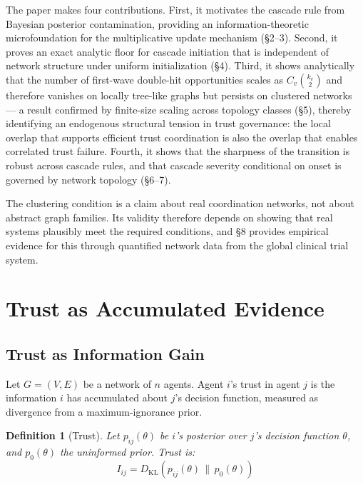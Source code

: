 \documentclass[11pt,a4paper]{article}
\newtheorem{definition}{Definition}
\begin{document}
The paper makes four contributions. First, it motivates the cascade rule from Bayesian posterior contamination, providing an information-theoretic microfoundation for the multiplicative update mechanism (\S2--3). Second, it proves an exact analytic floor for cascade initiation that is independent of network structure under uniform initialization (\S4). Third, it shows analytically that the number of first-wave double-hit opportunities scales as $C_v \binom{k_v}{2}$ and therefore vanishes on locally tree-like graphs but persists on clustered networks --- a result confirmed by finite-size scaling across topology classes (\S5), thereby identifying an endogenous structural tension in trust governance: the local overlap that supports efficient trust coordination is also the overlap that enables correlated trust failure. Fourth, it shows that the sharpness of the transition is robust across cascade rules, and that cascade severity conditional on onset is governed by network topology (\S6--7).

The clustering condition is a claim about real coordination networks, not about abstract graph families. Its validity therefore depends on showing that real systems plausibly meet the required conditions, and \S8 provides empirical evidence for this through quantified network data from the global clinical trial system.



\section{Trust as Accumulated Evidence}

\subsection{Trust as Information Gain}

Let $G = (V, E)$ be a network of $n$ agents. Agent $i$'s trust in agent $j$ is the information $i$ has accumulated about $j$'s decision function, measured as divergence from a maximum-ignorance prior.

\begin{definition}[Trust]
Let $p_{ij}(\theta)$ be $i$'s posterior over $j$'s decision function $\theta$, and $p_0(\theta)$ the uninformed prior. Trust is:
\begin{equation}
I_{ij} = D_{\mathrm{KL}}\left( p_{ij}(\theta) \,\|\, p_0(\theta) \right)
\label{eq:trust}
\end{equation}
\end{definition}
\end{document}
